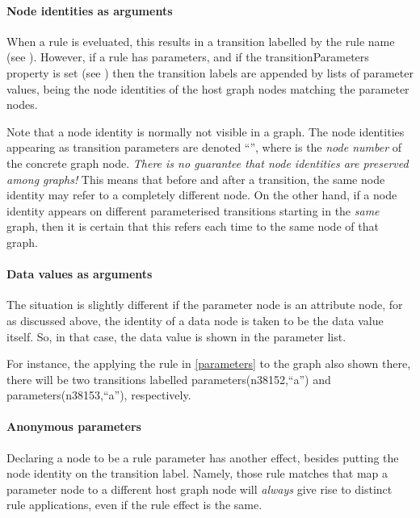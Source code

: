 \paragraph{Node identities as arguments}

When a rule is eveluated, this results in a transition labelled by the rule
name (see ). However, if a rule has parameters, and if the
\textsf{transitionParameters} property is set (see )
then the transition labels are appended by lists of parameter values, being the
node identities of the host graph nodes matching the parameter nodes.

Note that a node identity is normally not visible in a graph. The node
identities appearing as transition parameters are denoted ``'', where  is the \emph{node number} of the concrete graph
node. \emph{There is no guarantee that node identities are preserved among
graphs!} This means that before and after a transition, the same node identity
may refer to a completely different node. On the other hand, if a node identity
appears on different parameterised transitions starting in the \emph{same}
graph, then it is certain that this refers each time to the same node of that
graph.

\paragraph{Data values as arguments}

The situation is slightly different if the parameter node is an attribute node,
for as discussed above, the identity of a data node is taken to be the data
value itself. So, in that case, the data value is shown in the parameter list.

For instance, the applying the rule in \eqref{parameters} to the graph also
shown there, there will be two transitions labelled
\textsf{parameters(n38152,``a'')} and \textsf{parameters(n38153,``a'')},
respectively.

\paragraph{Anonymous parameters}

Declaring a node to be a rule parameter has another effect, besides putting the
node identity on the transition label. Namely, those rule matches that map a
parameter node to a different host graph node will \emph{always} give rise to
distinct rule applications, even if the rule effect is the same. 

